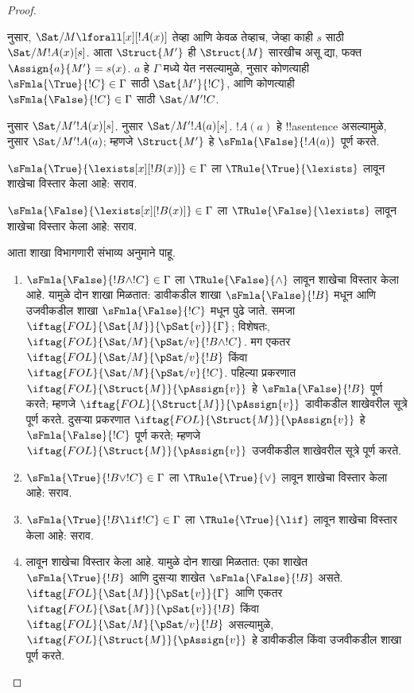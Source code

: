 \documentclass[../../../include/open-logic-section]{subfiles}
\begin{document}
\begin{proof}
\begin{enumerate}
{   नुसार,
  $\Sat/{M}{\lforall[x][!A(x)]}$ तेव्हा आणि केवळ तेव्हाच, जेव्हा काही $s$
  साठी $\Sat/{M}{!A(x)}[s]$. आता $\Struct{M'}$ ही $\Struct{M}$ सारखीच
  असू द्या, फक्त $\Assign{a}{M'} = s(x)$. $a$ हे $\Gamma$ मध्ये येत
  नसल्यामुळे,  नुसार कोणत्याही
  $\sFmla{\True}{!C} \in \Gamma$ साठी $\Sat{M'}{!C}$, आणि कोणत्याही
  $\sFmla{\False}{!C} \in \Gamma$ साठी $\Sat/{M'}{!C}$.

   नुसार $\Sat/{M'}{!A(x)}[s]$.
   नुसार $\Sat/{M'}{!A(a)}[s]$.
  $!A(a)$ हे !!a{sentence} असल्यामुळे,
   नुसार $\Sat/{M'}{!A(a)}$;
  म्हणजे $\Struct{M'}$ हे $\sFmla{\False}{!A(a)}$ पूर्ण करते.
\item $\sFmla{\True}{\lexists[x][!B(x)]} \in \Gamma$ ला
  $\TRule{\True}{\lexists}$ लावून शाखेचा विस्तार केला आहे: सराव.
\item $\sFmla{\False}{\lexists[x][!B(x)]} \in \Gamma$ ला
  $\TRule{\False}{\lexists}$ लावून शाखेचा विस्तार केला आहे: सराव.}{}
\end{enumerate}
आता शाखा विभागणारी संभाव्य अनुमाने पाहू.
\begin{enumerate}
\item $\sFmla{\False}{!B \land !C} \in \Gamma$ ला
  $\TRule{\False}{\land}$ लावून शाखेचा विस्तार केला आहे. यामुळे दोन शाखा
  मिळतात: डावीकडील शाखा $\sFmla{\False}{!B}$ मधून आणि उजवीकडील शाखा
  $\sFmla{\False}{!C}$ मधून पुढे जाते. समजा
  $\iftag{FOL}{\Sat{M}}{\pSat{v}}{\Gamma}$; विशेषतः,
  $\iftag{FOL}{\Sat/{M}}{\pSat/{v}}{!B \land !C}$. मग एकतर
  $\iftag{FOL}{\Sat/{M}}{\pSat/{v}}{!B}$ किंवा
  $\iftag{FOL}{\Sat/{M}}{\pSat/{v}}{!C}$. पहिल्या प्रकरणात
  $\iftag{FOL}{\Struct{M}}{\pAssign{v}}$ हे
  $\sFmla{\False}{!B}$ पूर्ण करते; म्हणजे
  $\iftag{FOL}{\Struct{M}}{\pAssign{v}}$ डावीकडील शाखेवरील सूत्रे पूर्ण करते.
  दुसऱ्या प्रकरणात $\iftag{FOL}{\Struct{M}}{\pAssign{v}}$ हे
  $\sFmla{\False}{!C}$ पूर्ण करते; म्हणजे
  $\iftag{FOL}{\Struct{M}}{\pAssign{v}}$ उजवीकडील शाखेवरील सूत्रे पूर्ण करते.
\item $\sFmla{\True}{!B \lor !C} \in \Gamma$ ला
  $\TRule{\True}{\lor}$ लावून शाखेचा विस्तार केला आहे: सराव.
\item $\sFmla{\True}{!B \lif !C} \in \Gamma$ ला
  $\TRule{\True}{\lif}$ लावून शाखेचा विस्तार केला आहे: सराव.
\item \Cut{} लावून शाखेचा विस्तार केला आहे. यामुळे दोन शाखा मिळतात: एका
  शाखेत $\sFmla{\True}{!B}$ आणि दुसऱ्या शाखेत $\sFmla{\False}{!B}$ असते.
  $\iftag{FOL}{\Sat{M}}{\pSat{v}}{\Gamma}$ आणि एकतर
  $\iftag{FOL}{\Sat{M}}{\pSat{v}}{!B}$ किंवा
  $\iftag{FOL}{\Sat/{M}}{\pSat/{v}}{!B}$ असल्यामुळे,
  $\iftag{FOL}{\Struct{M}}{\pAssign{v}}$ हे डावीकडील किंवा उजवीकडील शाखा
  पूर्ण करते.
\end{enumerate}
\end{proof}
\end{document}
